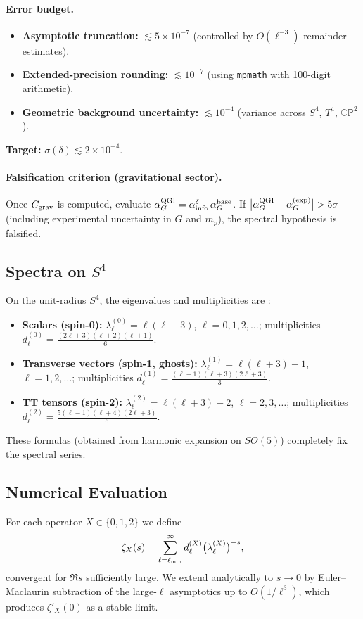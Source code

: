 \documentclass{article}
\numberwithin{equation}{section}
\theoremstyle{plain}
\theoremstyle{definition}
\theoremstyle{remark}
\begin{document}
\paragraph{Error budget.}
\begin{itemize}
    \item \textbf{Asymptotic truncation:} $\lesssim 5\times10^{-7}$ (controlled by $O(\ell^{-3})$ remainder estimates).
    \item \textbf{Extended-precision rounding:} $\lesssim 10^{-7}$ (using \texttt{mpmath} with 100-digit arithmetic).
    \item \textbf{Geometric background uncertainty:} $\lesssim 10^{-4}$ (variance across $S^4$, $T^4$, $\mathbb{CP}^2$).
\end{itemize}
\textbf{Target:} $\sigma(\delta)\lesssim 2\times10^{-4}$.

\paragraph{Falsification criterion (gravitational sector).}
Once $C_{\rm grav}$ is computed, evaluate $\alpha_G^{\rm QGI}=\alpha_{\rm info}^{\delta}\,\alpha_G^{\rm base}$. If $\big|\alpha_G^{\rm QGI}-\alpha_G^{(\rm exp)}\big|>5\sigma$ (including experimental uncertainty in $G$ and $m_p$), the spectral hypothesis is falsified.

\subsection{Spectra on $S^4$}
On the unit-radius $S^4$, the eigenvalues and multiplicities are \cite{Gilkey1984}:
\begin{itemize}
    \item \textbf{Scalars (spin-0):} $\lambda_\ell^{(0)}=\ell(\ell+3)$, $\ell=0,1,2,\dots$; multiplicities $d_\ell^{(0)}=\frac{(2\ell+3)(\ell+2)(\ell+1)}{6}$.
    \item \textbf{Transverse vectors (spin-1, ghosts):} $\lambda_\ell^{(1)}=\ell(\ell+3)-1$, $\ell=1,2,\dots$; multiplicities $d_\ell^{(1)}=\frac{(\ell-1)(\ell+3)(2\ell+3)}{3}$.
    \item \textbf{TT tensors (spin-2):} $\lambda_\ell^{(2)}=\ell(\ell+3)-2$, $\ell=2,3,\dots$; multiplicities $d_\ell^{(2)}=\frac{5(\ell-1)(\ell+4)(2\ell+3)}{6}$.
\end{itemize}
These formulas (obtained from harmonic expansion on $SO(5)$) completely fix the spectral series.

\subsection{Numerical Evaluation}
For each operator $X\in\{0,1,2\}$ we define
\[
\zeta_X(s)=\sum_{\ell=\ell_{\rm min}}^{\infty} d_\ell^{(X)} \big(\lambda_\ell^{(X)}\big)^{-s},
\]
convergent for $\Re s$ sufficiently large. We extend analytically to $s\to 0$ by Euler–Maclaurin subtraction of the large-$\ell$ asymptotics up to $O(1/\ell^3)$, which produces $\zeta'_X(0)$ as a stable limit.
\end{document}
